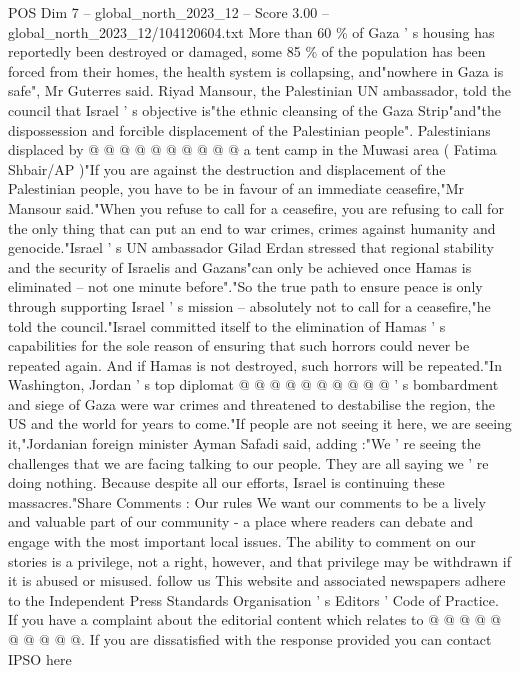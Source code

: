 \begin{textsample}{POS Dim 7 – global\_north\_2023\_12 – Score 3.00 – global\_north\_2023\_12/104120604.txt}
More than 60 \% of Gaza ' s housing has reportedly been destroyed or damaged, some 85 \% of the population has been forced from their homes, the health system is collapsing, and"nowhere in Gaza is safe", Mr Guterres said.
Riyad Mansour, the Palestinian UN ambassador, told the council that Israel ' s objective is"the ethnic cleansing of the Gaza Strip"and"the dispossession and forcible displacement of the Palestinian people".
Palestinians displaced by @ @ @ @ @ @ @ @ @ @ a tent camp in the Muwasi area ( Fatima Shbair/AP )"If you are against the destruction and displacement of the Palestinian people, you have to be in favour of an immediate ceasefire,"Mr Mansour said."When you refuse to call for a ceasefire, you are refusing to call for the only thing that can put an end to war crimes, crimes against humanity and genocide."Israel ' s UN ambassador Gilad Erdan stressed that regional stability and the security of Israelis and Gazans"can only be achieved once Hamas is eliminated -- not one minute before"."So the true path to ensure peace is only through supporting Israel ' s mission -- absolutely not to call for a ceasefire,"he told the council."Israel committed itself to the elimination of Hamas ' s capabilities for the sole reason of ensuring that such horrors could never be repeated again.
And if Hamas is not destroyed, such horrors will be repeated."In Washington, Jordan ' s top diplomat @ @ @ @ @ @ @ @ @ @ ' s bombardment and siege of Gaza were war crimes and threatened to destabilise the region, the US and the world for years to come."If people are not seeing it here, we are seeing it,"Jordanian foreign minister Ayman Safadi said, adding :"We ' re seeing the challenges that we are facing talking to our people.
They are all saying we ' re doing nothing.
Because despite all our efforts, Israel is continuing these massacres."Share Comments : Our rules We want our comments to be a lively and valuable part of our community - a place where readers can debate and engage with the most important local issues.
The ability to comment on our stories is a privilege, not a right, however, and that privilege may be withdrawn if it is abused or misused. follow us This website and associated newspapers adhere to the Independent Press Standards Organisation ' s Editors ' Code of Practice.
If you have a complaint about the editorial content which relates to @ @ @ @ @ @ @ @ @ @.
If you are dissatisfied with the response provided you can contact IPSO here

\end{textsample}
